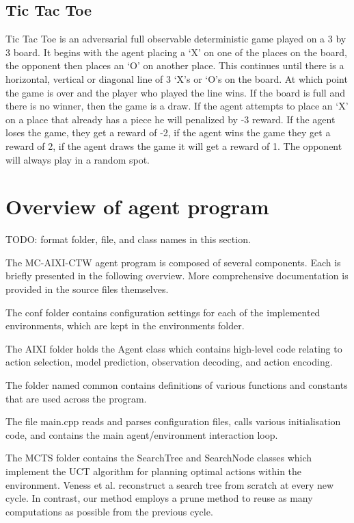\documentclass{article}
\theoremstyle{definition}
\newtheorem{primary statistics}[definition]{Primary Statistics}
\newtheorem{auxiliary statistics}[definition]{Auxiliary Statistics}
\begin{document}
\subsection{Tic Tac Toe}
Tic Tac Toe is an adversarial full observable deterministic game played on a 3 by 3 board. It begins with the agent placing a ‘X’ on one of the places on the board, the opponent then places an ‘O’ on another place. This continues until there is a horizontal, vertical or diagonal line of 3 ‘X’s or ‘O’s on the board. At which point the game is over and the player who played the line wins. If the board is full and there is no winner, then the game is a draw. If the agent attempts to place an ‘X’ on a place that already has a piece he will penalized by -3 reward. If the agent loses the game, they get a reward of -2, if the agent wins the game they get a reward of 2, if the agent draws the game it will get a reward of 1. The opponent will always play in a random spot.


\section{Overview of agent program}
TODO: format folder, file, and class names in this section.

The MC-AIXI-CTW agent program is composed of several components. Each is briefly presented in the following overview. More comprehensive documentation is provided in the source files themselves.

The conf folder contains configuration settings for each of the implemented environments, which are kept in the environments folder. 

The AIXI folder holds the Agent class which contains high-level code relating to action selection, model prediction, observation decoding, and action encoding.

The folder named common contains definitions of various functions and constants that are used across the program. 

The file main.cpp reads and parses configuration files, calls various initialisation code, and contains the main agent/environment interaction loop.

The MCTS folder contains the SearchTree and SearchNode classes which implement the UCT algorithm for planning optimal actions within the environment. Veness et al. reconstruct a search tree from scratch at every new cycle. In contrast, our method employs a prune method to reuse as many computations as possible from the previous cycle.
\end{document}
